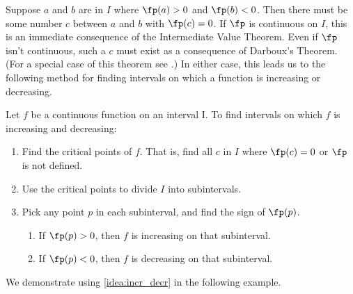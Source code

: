 Suppose $a$ and $b$ are in $I$ where $\fp(a)>0$ and $\fp(b)<0$. Then there must be some number $c$ between $a$ and $b$ with $\fp(c)=0$. If $\fp$ is continuous on $I$, this is an immediate consequence of the Intermediate Value Theorem.  Even if $\fp$ isn't continuous, such a $c$ must exist as a consequence of Darboux's Theorem.  (For a special case of this theorem see .)  In either case, this leads us to the following method for finding intervals on which a function is increasing or decreasing.

\begin{keyidea}\label{idea:incr_decr}
Let $f$ be a continuous function on an interval I. To find intervals on which $f$ is increasing and decreasing:
\begin{enumerate}
\item	Find the critical points of $f$. That is, find all $c$ in $I$ where $\fp(c) = 0$ or $\fp$ is not defined.
\item	Use the critical points to divide $I$ into subintervals.
\item	Pick any point $p$ in each subinterval, and find the sign of $\fp(p)$. 
		\begin{enumerate}
		\item	If $\fp(p)>0$, then $f$ is increasing on that subinterval.
		\item	If $\fp(p)<0$, then $f$ is decreasing on that subinterval.
		\end{enumerate}
\end{enumerate}
\end{keyidea}


We demonstrate using \autoref{idea:incr_decr} in the following example.


